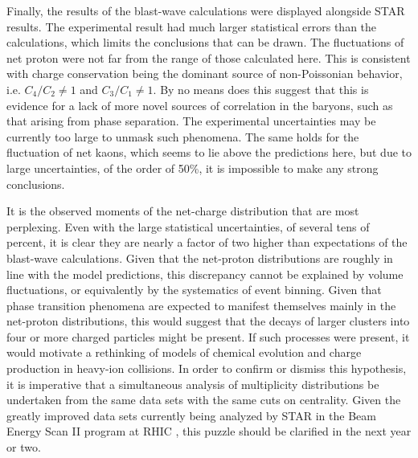 Finally, the results of the blast-wave calculations were displayed alongside STAR results. The experimental result had much larger statistical errors than the calculations, which limits the conclusions that can be drawn. The fluctuations of net proton were not far from the range of those calculated here. This is consistent with charge conservation being the dominant source of non-Poissonian behavior, i.e. $C_4/C_2\ne 1$ and $C_3/C_1\ne 1$. By no means does this suggest that this is evidence for a lack of more novel sources of correlation in the baryons, such as that arising from phase separation. The experimental uncertainties may be  currently too large to unmask such phenomena. The same holds for the fluctuation of net kaons, which seems to lie above the predictions here, but due to large uncertainties, of the order of 50\%, it is impossible to make any strong conclusions.

It is the observed moments of the net-charge distribution that are most perplexing. Even with the large statistical uncertainties, of several tens of percent, it is clear they are nearly a factor of two higher than expectations of the blast-wave calculations. Given that the net-proton distributions are roughly in line with the model predictions, this discrepancy cannot be explained by volume fluctuations, or equivalently by the systematics of event binning. Given that phase transition phenomena are expected to manifest themselves mainly in the net-proton distributions, this would suggest that the decays of larger clusters into four or more charged particles might be present. If such processes were present, it would motivate a rethinking of models of chemical evolution and charge production in heavy-ion collisions. In order to confirm or dismiss this hypothesis, it is imperative that a simultaneous analysis of multiplicity distributions be undertaken from the same data sets with the same cuts on centrality. Given the greatly improved data sets currently being analyzed by STAR in the Beam Energy Scan II program at RHIC \cite{Yang:2017llt}, this puzzle should be clarified in the next year or two.

